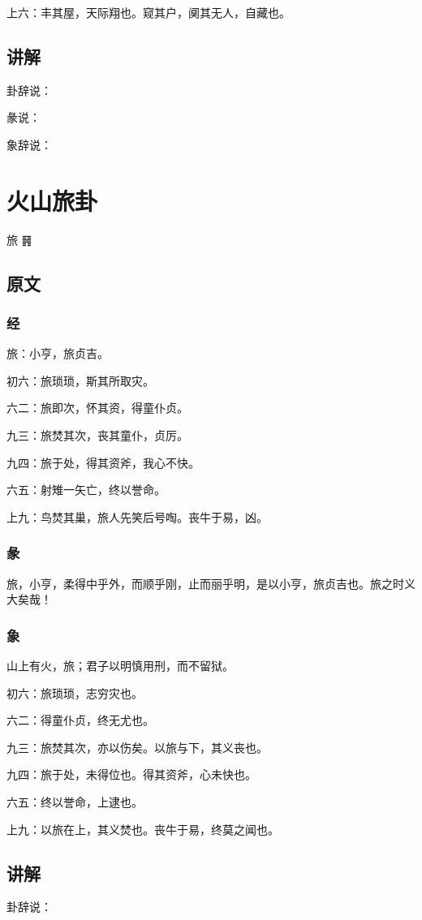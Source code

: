 \documentclass[12pt,oneside]{book}
\begin{document}
上六：丰其屋，天际翔也。窥其户，阒其无人，自藏也。

\section{讲解}
卦辞说：

彖说：

象辞说：

\chapter{火山旅卦}
旅 {\Large ䷷}


\section{原文}

\subsection{经}
旅：小亨，旅贞吉。

初六：旅琐琐，斯其所取灾。

六二：旅即次，怀其资，得童仆贞。

九三：旅焚其次，丧其童仆，贞厉。

九四：旅于处，得其资斧，我心不快。

六五：射雉一矢亡，终以誉命。

上九：鸟焚其巢，旅人先笑后号啕。丧牛于易，凶。

\subsection{彖}
旅，小亨，柔得中乎外，而顺乎刚，止而丽乎明，是以小亨，旅贞吉也。旅之时义大矣哉！

\subsection{象}
山上有火，旅；君子以明慎用刑，而不留狱。

初六：旅琐琐，志穷灾也。

六二：得童仆贞，终无尤也。

九三：旅焚其次，亦以伤矣。以旅与下，其义丧也。

九四：旅于处，未得位也。得其资斧，心未快也。

六五：终以誉命，上逮也。

上九：以旅在上，其义焚也。丧牛于易，终莫之闻也。

\section{讲解}
卦辞说：
\end{document}
